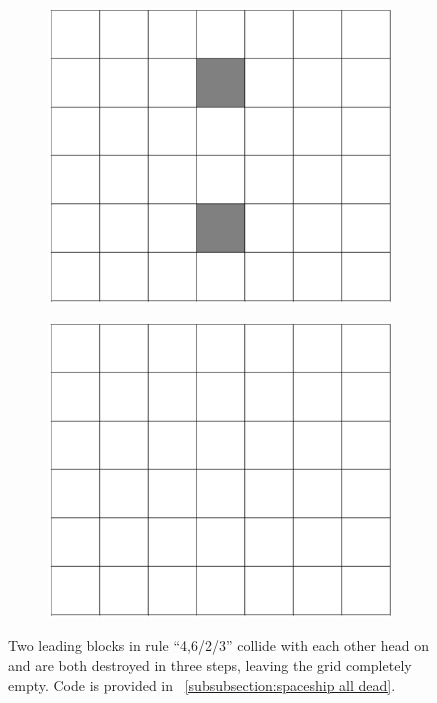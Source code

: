 \documentclass[12pt]{article}
\numberwithin{figure}{section} %
\begin{document}
\begin{figure}[H]
\begin{subfigure}{0.24\textwidth}
     		\subcaption{}
   	\end{subfigure}
     	\begin{subfigure}{0.24\textwidth}
     		\centering
     		\includegraphics[width=\linewidth]{Section4/31.2}
     		\subcaption{}
   	\end{subfigure}
        	\begin{subfigure}{0.24\textwidth}
     		\centering
     		\includegraphics[width=\linewidth]{Section4/31.3}
     		\subcaption{}
   	\end{subfigure}
   	\caption[Destroyed spaceships in collision]{Two leading blocks in rule “4,6/2/3” collide with each other head on and are both destroyed in three steps, leaving the grid completely empty. Code is provided in ~\ref{subsubsection:spaceship all dead}. }
   	\label{fig:spaceship all dead}
	\vspace{-1.5em}
\end{figure}
\end{document}
